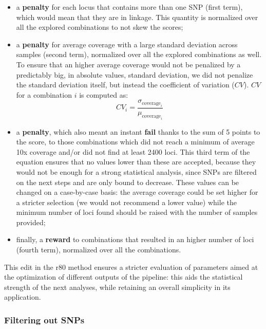 \documentclass[a4paper, 12pt]{report}
\begin{document}
\begin{itemize}\setlength\itemsep{-0.2em}
	\item a \textbf{penalty} for each locus that contains more than one SNP (first term), which would mean that they are in linkage. This quantity is normalized over all the explored combinations to not skew the scores;
	\item a \textbf{penalty} for average coverage with a large standard deviation across samples (second term), normalized over all the explored combinations as well. To ensure that an higher average coverage would not be penalized by a predictably big, in absolute values, standard deviation, we did not penalize the standard deviation itself, but instead the coefficient of variation ($CV$). $CV$ for a combination $i$ is computed as:
	\begin{equation}
		CV_i = \frac{\sigma_{\text{coverage}_i}}{\mu_{\text{coverage}_i}}
	\end{equation}
	\item a \textbf{penalty}, which also meant an instant \textbf{fail} thanks to the sum of 5 points to the score, to those combinations which did not reach a minimum of average 10x coverage and/or did not find at least 2400 loci. This third term of the equation ensures that no values lower than these are accepted, because they would not be enough for a strong statistical analysis, since SNPs are filtered on the next steps and are only bound to decrease. These values can be changed on a case-by-case basis: the average coverage could be set higher for a stricter selection (we would not recommend a lower value) while the minimum number of loci found should be raised with the number of samples provided;
	\item finally, a \textbf{reward} to combinations that resulted in an higher number of loci (fourth term), normalized over all the combinations.
\end{itemize}
\vspace{-1.5em}
This edit in the r80 method ensures a stricter evaluation of parameters aimed at the optimization of different outputs of the pipeline: this aids the statistical strength of the next analyses, while retaining an overall simplicity in its application. 

\subsubsection{Filtering out SNPs}
\end{document}
